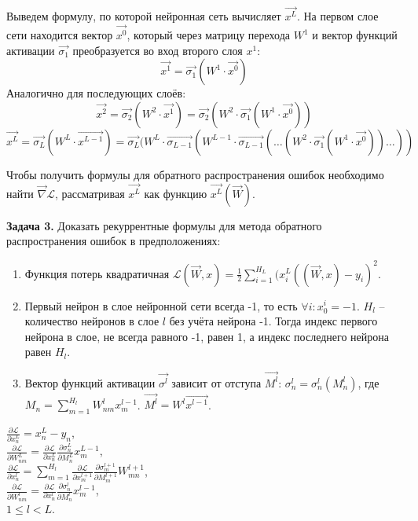 Выведем формулу, по которой нейронная сеть вычисляет $\overrightarrow{x^L}$. На первом слое сети находится вектор $\overrightarrow{x^0}$, который через матрицу перехода $W^1$ и вектор функций активации $\overrightarrow{\sigma_1}$ преобразуется во вход второго слоя $x^1$:
$$
	\overrightarrow{x^1} = \overrightarrow{\sigma_1} (W^1 \cdot \overrightarrow{x^0})
$$
Аналогично для последующих слоёв:
$$
	\overrightarrow{x^2} = \overrightarrow{\sigma_2} (W^2 \cdot \overrightarrow{x^1}) = \overrightarrow{\sigma_2} (W^2 \cdot \overrightarrow{\sigma_1} (W^1 \cdot \overrightarrow{x^0}))
$$
$$
	\overrightarrow{x^L} = \overrightarrow{\sigma_L}(W^L \cdot \overrightarrow{x^{L-1}}) = \overrightarrow{\sigma_L}(W^L \cdot \overrightarrow{\sigma_{L-1}} (W^{L-1} \cdot \overrightarrow{\sigma_{L-1}}( \dots ( W^2 \cdot \overrightarrow{\sigma_1} (W^1 \cdot \overrightarrow{x^0})) \dots ))
$$

Чтобы получить формулы для обратного распространения ошибок необходимо найти $\overrightarrow{\nabla} \mathcal{L}$, рассматривая $\overrightarrow{x^L}$ как функцию $\overrightarrow{x^L} (\overrightarrow{W})$.

\textbf{Задача 3.} Доказать рекуррентные формулы для метода обратного распространения ошибок в предположениях:
\begin{enumerate}
	\item Функция потерь квадратичная $\mathcal{L} (\overrightarrow{W}, x) = \frac{1}{2} \sum\limits_{i = 1}^{H_L} (x^L_i ((\overrightarrow{W}, x) - y_i)^2$.

	\item Первый нейрон в слое нейронной сети всегда -1, то есть $\forall i: x^i_0 = -1$. $H_l$ -- количество нейронов в слое $l$ без учёта нейрона -1. Тогда индекс первого нейрона в слое, не всегда равного -1, равен 1, а индекс последнего нейрона равен $H_l$.

	\item Вектор функций активации $\overrightarrow{\sigma^l}$ зависит от отступа $\overrightarrow{M^l}$: $\sigma^l_n = \sigma^l_n(M^l_n)$, где $M_n = \sum\limits_{m = 1}^{H_l} W^l_{nm} x^{l-1}_{m}$. $\overrightarrow{M^l} = W^l \overrightarrow{x^{l-1}}$.
\end{enumerate}
$
	\frac{\partial \mathcal{L}}{\partial x^L_n} = x^L_n - y_n
$, \\
$
	\frac{\partial \mathcal{L}}{\partial W^L_{nm}} = \frac{\partial \mathcal{L}}{\partial x^L_n} \frac{\partial \sigma^L_n}{\partial M^L_n} x^{L-1}_{m}
$, \\
$
	\frac{\partial \mathcal{L}}{\partial x^{l}_n} = \sum\limits_{m = 1}^{H_l} \frac{\partial \mathcal{L}}{\partial x^{l+1}_m} \frac{\partial \sigma^{l+1}_m}{\partial M^{l+1}_m} W^{l+1}_{mn}
$, \\
$
	\frac{\partial \mathcal{L}}{\partial W^{l}_{nm}} = \frac{\partial \mathcal{L}}{\partial x^{l}_n} \frac{\partial \sigma^{l}_n}{\partial M^{l}_n} x^{l-1}_{m}
$, \\
$1 \le l < L$.

